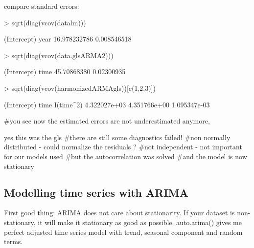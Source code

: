 \documentclass[11pt, a4paper]{article} %
\begin{document}
\linebreak

compare standard errors: 
\begin{Schunk}
\begin{Sinput}
> sqrt(diag(vcov(datalm)))
\end{Sinput}
 (Intercept)         year 
16.978232786  0.008546518 \begin{Sinput}
> sqrt(diag(vcov(data.glsARMA2)))
\end{Sinput}
(Intercept)        time 
45.70868380  0.02300935 \begin{Sinput}
> sqrt(diag(vcov(harmonizedARMAgls))[c(1,2,3)])
\end{Sinput}
 (Intercept)         time    I(time^2) 
4.322027e+03 4.351766e+00 1.095347e-03 \end{Schunk}
\linebreak
#you see now the estimated errors are not underestimated anymore, 


\linebreak

  yes this was the gls 
#there are still some diagnostics failed! 
#non normally distributed - could normalize the residuals ? 
#not independent - not important for our models used
#but the autocorrelation was solved
#and the model is now stationary 

\subsection{Modelling time series with ARIMA }
First good thing: ARIMA does not care about stationarity. If your dataset is non-stationary, it will make it stationary as good as possible. auto.arima() gives me perfect adjusted time series model with trend, seasonal component and random terms.\\
\end{document}
